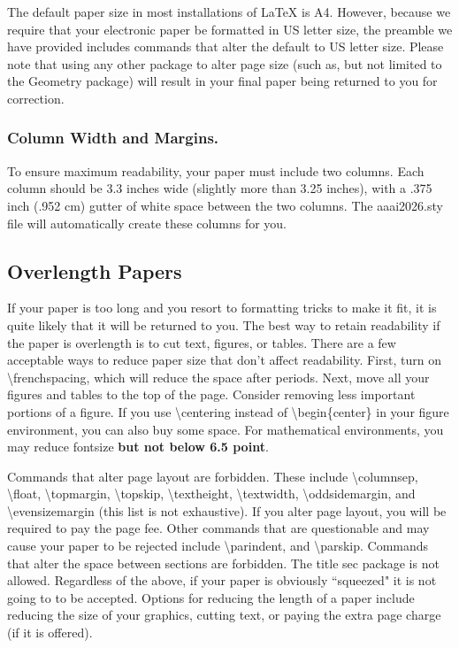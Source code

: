 The default paper size in most installations of \LaTeX{} is A4. However, because we require that your electronic paper be formatted in US letter size, the preamble we have provided includes commands that alter the default to US letter size. Please note that using any other package to alter page size (such as, but not limited to the Geometry package) will result in your final paper being returned to you for correction.


\subsubsection{Column Width and Margins.}
To ensure maximum readability, your paper must include two columns. Each column should be 3.3 inches wide (slightly more than 3.25 inches), with a .375 inch (.952 cm) gutter of white space between the two columns. The aaai2026.sty file will automatically create these columns for you.

\subsection{Overlength Papers}
If your paper is too long and you resort to formatting tricks to make it fit, it is quite likely that it will be returned to you. The best way to retain readability if the paper is overlength is to cut text, figures, or tables. There are a few acceptable ways to reduce paper size that don't affect readability. First, turn on \textbackslash frenchspacing, which will reduce the space after periods. Next, move all your figures and tables to the top of the page. Consider removing less important portions of a figure. If you use \textbackslash centering instead of \textbackslash begin\{center\} in your figure environment, you can also buy some space. For mathematical environments, you may reduce fontsize {\bf but not below 6.5 point}.


Commands that alter page layout are forbidden. These include \textbackslash columnsep,  \textbackslash float, \textbackslash topmargin, \textbackslash topskip, \textbackslash textheight, \textbackslash textwidth, \textbackslash oddsidemargin, and \textbackslash evensizemargin (this list is not exhaustive). If you alter page layout, you will be required to pay the page fee. Other commands that are questionable and may cause your paper to be rejected include \textbackslash parindent, and \textbackslash parskip. Commands that alter the space between sections are forbidden. The title sec package is not allowed. Regardless of the above, if your paper is obviously ``squeezed" it is not going to to be accepted. Options for reducing the length of a paper include reducing the size of your graphics, cutting text, or paying the extra page charge (if it is offered).


